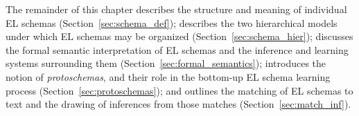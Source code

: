 The remainder of this chapter describes the structure and meaning of individual EL schemas (Section~\ref{sec:schema_def}); describes the two hierarchical models under which EL schemas may be organized (Section~\ref{sec:schema_hier}); discusses the formal semantic interpretation of EL schemas and the inference and learning systems surrounding them (Section~\ref{sec:formal_semantics}); introduces the notion of \textit{protoschemas}, and their role in the bottom-up EL schema learning process (Section~\ref{sec:protoschemas}); and outlines the matching of EL schemas to text and the drawing of inferences from those matches (Section~\ref{sec:match_inf}).





